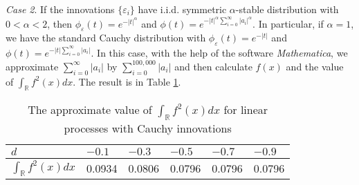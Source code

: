 \documentclass[11pt]{article}
\begin{document}

{\it Case 2}. If the innovations $\{\varepsilon_i\}$ have i.i.d. symmetric $\alpha$-stable distribution with $0<\alpha<2$, then $\phi_\varepsilon(t)=e^{-|t|^\alpha}$ and 
$\phi(t)=e^{-|t|^\alpha\sum_{i=0}^\infty |a_i|^\alpha}$.
In particular, if $\alpha=1$, we have the standard Cauchy distribution with $\phi_\varepsilon(t)=e^{-|t|}$ and 
$\phi(t)=e^{-|t|\sum_{i=0}^\infty |a_i|}$. In this case, with the help of the software {\it Mathematica}, we approximate $\sum_{i=0}^\infty |a_i|$ by  $\sum_{i=0}^{100,000} |a_i|$ and then calculate $f(x)$ and the value of $\int_\mathbb{R} f^2(x)dx$. The result is in Table \ref{tab2}. 
 
 \begin{table}[H]%
\center
\caption{ The approximate value of $\int_\mathbb{R} f^2(x)dx$ for linear processes with Cauchy innovations} 
\label{tab2}
\bigskip
\begin{tabular}{| l | l | l | l | l | l |}
\hline                                                     
\;\;$d$                                          & $-0.1$  & $-0.3$ &  $-0.5$ &  $-0.7$ &  $-0.9$ \\
\hline

\;\;$\int_\mathbb{R} f^2(x)dx$ & 0.0934 & 0.0806 & 0.0796 & 0.0796 & 0.0796 \\
\hline
\end{tabular}  
\end{table}
\end{document}
